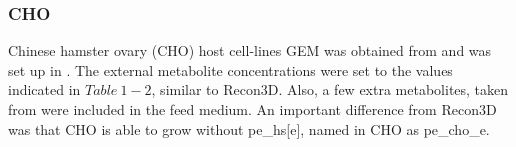 	\subsubsection{CHO}
	
	Chinese hamster ovary (CHO) host cell-lines GEM was obtained from \cite{Hefzi2016a} and was set up in \cite{Fernandez-de-Cossio-Diaz2018b}.  The external metabolite concentrations were set to the values indicated in $Table\ 1-2$, similar to Recon3D. Also, a few extra metabolites, taken from \cite{Fernandez-de-Cossio-Diaz2018b} were included in the feed medium. An important difference from Recon3D was that CHO is able to grow without pe\_hs[e], named in CHO as pe\_cho\_e. 